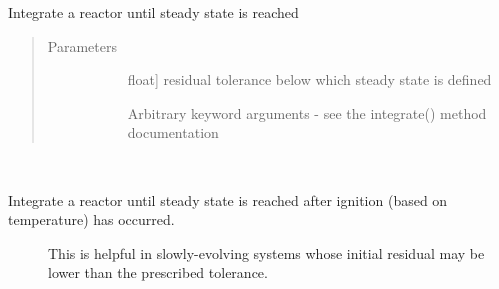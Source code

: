 \documentclass[letterpaper,10pt,english]{sphinxmanual}
\begin{document}
\begin{fulllineitems}

\begin{fulllineitems}
\label{\detokenize{spitfire.chemistry.reactors:spitfire.chemistry.reactors.HomogeneousReactor.integrate_to_steady}}
Integrate a reactor until steady state is reached
\begin{quote}\begin{description}
\item[{Parameters}] \leavevmode\begin{description}
\item[{}] \leavevmode{[}float{]}
residual tolerance below which steady state is defined

\item[{}] \leavevmode
Arbitrary keyword arguments - see the integrate() method documentation

\end{description}

\end{description}\end{quote}

\end{fulllineitems}


\begin{fulllineitems}
\label{\detokenize{spitfire.chemistry.reactors:spitfire.chemistry.reactors.HomogeneousReactor.integrate_to_steady_after_ignition}}~\begin{description}
\item[{Integrate a reactor until steady state is reached after ignition (based on temperature) has occurred.}] \leavevmode
This is helpful in slowly-evolving systems whose initial residual may be lower than the prescribed tolerance.


\end{description}
\end{fulllineitems}
\end{fulllineitems}
\end{document}
